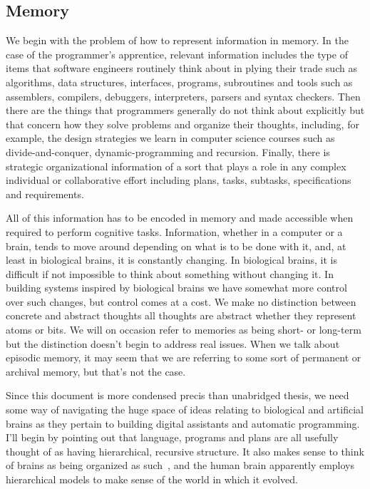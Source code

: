 
\subsection{Memory}


We begin with the problem of how to represent information in memory. In the case of the programmer's apprentice, relevant information includes the type of items that software engineers routinely think about in plying their trade such as algorithms, data structures, interfaces, programs, subroutines and tools such as assemblers, compilers, debuggers, interpreters, parsers and syntax checkers. Then there are the things that programmers generally do not think about explicitly but that concern how they solve problems and organize their thoughts, including, for example, the design strategies we learn in computer science courses such as divide-and-conquer, dynamic-programming and recursion. Finally, there is strategic organizational information of a sort that plays a role in any complex individual or collaborative effort including plans, tasks, subtasks, specifications and requirements.

All of this information has to be encoded in memory and made accessible when required to perform cognitive tasks. Information, whether in a computer or a brain, tends to move around depending on what is to be done with it, and, at least in biological brains, it is constantly changing. In biological brains, it is difficult if not impossible to think about something without changing it. In building systems inspired by biological brains we have somewhat more control over such changes, but control comes at a cost. We make no distinction between concrete and abstract thoughts \emdash{} all thoughts are abstract whether they represent atoms or bits. We will on occasion refer to memories as being short- or long-term but the distinction doesn't begin to address real issues. When we talk about episodic memory, it may seem that we are referring to some sort of permanent or archival memory, but that's not the case.

Since this document is more condensed precis than unabridged thesis, we need some way of navigating the huge space of ideas relating to biological and artificial brains as they pertain to building digital assistants and automatic programming. I'll begin by pointing out that language, programs and plans are all usefully thought of as having hierarchical, recursive structure. It also makes sense to think of brains as being organized as such~\cite{Ballard2015,Kurzweil2012,DeanAMAI-06,GeorgeandHawkinsIJCNN-05,DeanAAAI-05,Hawkins04}, and the human brain apparently employs hierarchical models to make sense of the world in which it evolved. 

